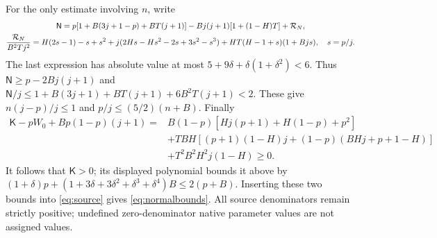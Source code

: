 \documentclass[10pt]{article}
\begin{document}
For the only estimate involving $n$, write
\begin{gather}
 \mathsf N=p[1+B(3j+1-p)+BT(j+1)]
       -Bj(j+1)[1+(1-H)T]+\mathcal R_N,\notag\\
 \frac{\mathcal R_N}{B^2Tj^2}
 =H(2s-1)-s+s^2+j(2Hs-Hs^2-2s+3s^2-s^3)
                 +HT(H-1+s)(1+Bjs),\quad s=p/j.
 \label{eq:NNrem}
\end{gather}
The last expression has absolute value at most
$5+9\delta+\delta(1+\delta^2)<6$.
Thus $\mathsf N\geq p-2Bj(j+1)$ and
$\mathsf N/j\leq1+B(3j+1)+BT(j+1)+6B^2T(j+1)<2$.
These give $n(j-p)/j\leq1$ and $p/j\leq(5/2)(n+B)$.
Finally
\begin{align*}
 \mathsf K-pW_0+Bp(1-p)(j+1)
 ={}&B(1-p)[Hj(p+1)+H(1-p)+p^2]\\
 &+TBH[(p+1)(1-H)j+(1-p)(BHj+p+1-H)]\\
 &+T^2B^2H^2j(1-H)\geq0 .
\end{align*}
It follows that $\mathsf K>0$; its displayed polynomial bounds it above by
$ (1+\delta)p+(1+3\delta+3\delta^2+\delta^3+\delta^4)B
\leq2(p+B)$. Inserting these two bounds into \eqref{eq:source} gives
\eqref{eq:normalbounds}. All source denominators remain strictly positive;
undefined zero-denominator native parameter values are not assigned values.
\end{document}
